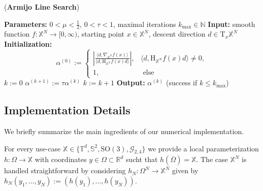 \documentclass[%
a4paper,11pt,DIV=11,%
abstract=on%
]{scrartcl}
\begin{document}
\begin{algorithm}[ht]
\caption{(\textbf{Armijo Line Search})}
\begin{algorithmic}
\State \textbf{Parameters:} $0 < \mu < \tfrac12$, $0 < \tau < 1$, maximal iterations $k_{\max} \in \mathbb N$
\State \textbf{Input:} smooth function $f:\mathbb X^{N} \to [0,\infty)$, starting point $x \in \mathbb X^{N}$, descent direction $d \in \mathrm T_{x}\mathbb X^{N}$
\State \textbf{Initialization:}
\[\alpha^{(0)} :=
    \begin{cases}
      \left| \frac{ \langle d, \nabla_{\mathbb X^{N}} f(x) \rangle}{ \langle d, \mathrm{H}_{\mathbb X^{N}}f(x) d\rangle } \right|,
      & \langle d, \mathrm{H}_{\mathbb X^{N}}f(x) d \rangle \ne 0,\\
      1, & \text{ else}
    \end{cases}
  \]
\State $k:=0$
\State $\alpha^{(k+1)} := \tau \alpha^{(k)}$
\State $k:=k+1$
\EndWhile
\State \textbf{Output:} $\alpha^{(k)}$ (success if $k \le k_{\max}$)
\end{algorithmic}
\label{alg:armijo}
\end{algorithm}

\subsection{Implementation Details}

We briefly summarize the main ingredients of our numerical implementation.

For every  use-case $\mathbb X \in \{ \mathbb T^{d}, \mathbb S^{2}, \mathrm{SO(3)}, \mathcal G_{2,4}\}$ 
we provide a local parameterization $h:\Omega \to \mathbb X$ with coordinates $y \in \Omega \subset \mathbb R^{d}$ 
sucht that $h(\overline \Omega) = \mathbb X$. {\color{blue} The case $\mathbb X^{N}$ 
is handled straightforward by considering $h_{N}:\Omega^{N} \to \mathbb X^{N}$ given by $h_{N}(y_{1},\dots,y_{N}) := (h(y_{1}),\dots,h(y_{N}))$.}
\end{document}
